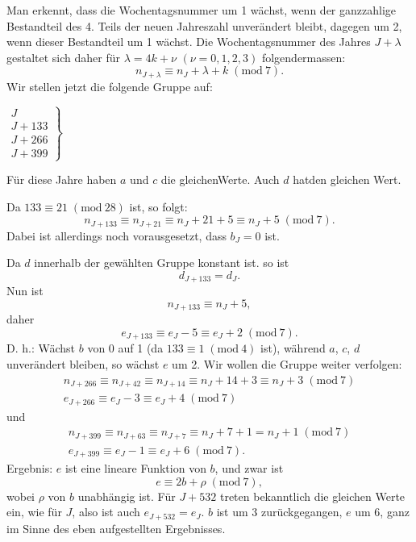 \noindent Man erkennt, dass die Wochentagsnummer um 1 wächst, wenn der ganzzahlige
Bestandteil des 4. Teils der neuen Jahreszahl unverändert bleibt, dagegen um
2, wenn dieser Bestandteil um 1 wächst. Die Wochentagsnummer des Jahres
$J+\lambda$ gestaltet sich daher für $\lambda=4k+\nu$ $(\nu=0,1,2,3)$ folgendermassen:
\[
n_{J+\lambda}\equiv n_J+\lambda+k\; (\mathrm{mod}\ 7).
\]
\noindent Wir stellen jetzt die folgende Gruppe auf:
\clearpage{}
\begin{center}
$\left.\begin{array}{l}J\\J+133\\J+266\\J+399\end{array}\right\}$
\begin{minipage}{.39\linewidth}Für diese Jahre haben\newline
$a$ und $c$ die gleichen\newline Werte. Auch $d$ hat\newline den gleichen Wert.\end{minipage}
\end{center}
\noindent\hspace*{\parindent}Da $133\equiv21\; (\mathrm{mod}\ 28)$ ist, so folgt:
\[
n_{J+133}\equiv n_{J+21}\equiv n_J+21+5\equiv n_J+5\; (\mathrm{mod}\ 7).
\]
\noindent Dabei ist allerdings noch vorausgesetzt, dass $b_J=0$ ist.

Da $d$ innerhalb der gewählten Gruppe konstant ist. so ist
\[
d_{J+133}=d_J.
\]
\noindent Nun ist
\[
n_{J+133}\equiv n_J+5,
\]
\noindent daher
\[
e_{J+133}\equiv e_J-5\equiv e_J+2\; (\mathrm{mod}\ 7).
\]
\noindent D. h.: Wächst $b$ von 0 auf 1 (da $133\equiv1\; (\mathrm{mod}\ 4)$ ist), während $a$, $c$, $d$ unverändert bleiben, so wächst $e$ um 2. Wir wollen die Gruppe weiter verfolgen:
\[
\begin{gathered}
n_{J+266}\equiv n_{J+42}\equiv n_{J+14}\equiv n_J+14+3\equiv n_J+3\; (\mathrm{mod}\ 7)\\
e_{J+266}\equiv e_J-3\equiv e_J+4\; (\mathrm{mod}\ 7)
\end{gathered}
\]
\noindent und
\[
\begin{gathered}
n_{J+399}\equiv n_{J+63}\equiv n_{J+7}\equiv n_J+7+1=n_J+1\; (\mathrm{mod}\ 7)\\
e_{J+399}\equiv e_J-1\equiv e_J+6\; (\mathrm{mod}\ 7).
\end{gathered}
\]
\noindent Ergebnis: $e$ ist eine lineare Funktion von $b$, und zwar ist
\[
e\equiv2b+\rho\; (\mathrm{mod}\ 7),
\]
\noindent wobei $\rho$ von $b$ unabhängig ist. Für $J+532$ treten bekanntlich die gleichen
Werte ein, wie für $J$, also ist auch $e_{J+532}=e_J$. $b$ ist um 3 zurückgegangen,
$e$ um 6, ganz im Sinne des eben aufgestellten Ergebnisses.

